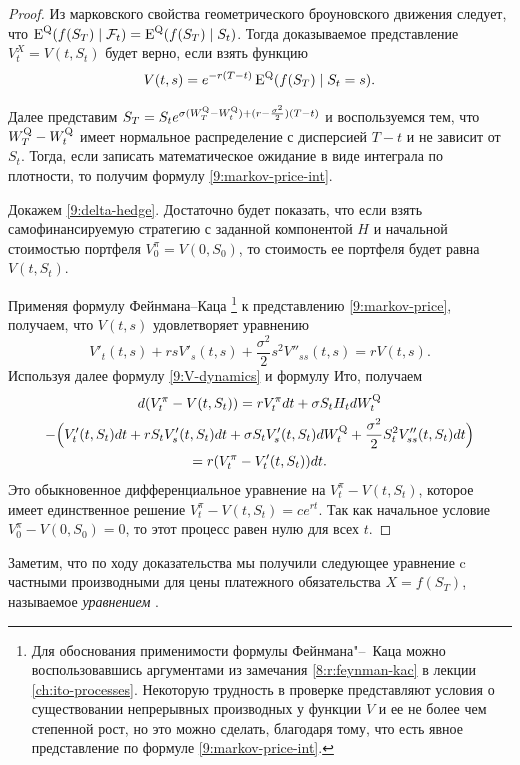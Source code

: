 \begin{proof}
Из марковского свойства геометрического броуновского движения следует, что $\operatorname{E}^{\mathrm{Q}}(f(S_T) \mid \mathcal{F}_t) = \operatorname{E}^{\mathrm{Q}}(f(S_T) \mid S_t)$.
Тогда доказываемое представление $V_t^X=V(t,S_t)$ будет верно, если взять функцию
\begin{equation}
\label{9:markov-price}
V(t,s) = e^{-r(T-t)} \operatorname{E}^{\mathrm{Q}}(f(S_T) \mid S_t = s).
\end{equation}

Далее представим $S_T = S_t e^{\sigma (W_T^{\mathrm{Q}} - W_t^{\mathrm{Q}}) + (r-\frac{\sigma^2}{2})(T-t)}$ и воспользуемся тем, что $W_T^{\mathrm{Q}} - W_t^{\mathrm{Q}}$ имеет нормальное распределение с дисперсией $T-t$ и не зависит от $S_t$. Тогда, если записать математическое ожидание в виде интеграла по плотности, то получим формулу \eqref{9:markov-price-int}. 

Докажем \eqref{9:delta-hedge}. Достаточно будет показать, что если взять самофинансируемую стратегию с заданной компонентой $H$ и начальной стоимостью портфеля $V_0^\pi = V(0,S_0)$, то стоимость ее портфеля будет равна $V(t,S_t)$.

Применяя формулу Фейнмана--Каца%
\footnote{Для обоснования применимости формулы Фейнмана"--~Каца можно воспользовавшись аргументами из замечания \ref{8:r:feynman-kac} в лекции \ref{ch:ito-processes}.
Некоторую трудность в проверке представляют условия о существовании непрерывных производных у функции $V$ и ее не более чем степенной рост, но это можно сделать, благодаря тому, что есть явное представление по формуле \eqref{9:markov-price-int}.} к представлению \eqref{9:markov-price}, получаем, что $V(t,s)$ удовлетворяет уравнению
\[
V'_t(t,s) + rsV'_s(t,s) + \frac{\sigma^2}{2} s^2 V''_{ss}(t,s) = rV(t,s).
\]
Используя далее формулу \eqref{9:V-dynamics} и формулу Ито, получаем
\begin{multline*}
d (V_t^\pi - V(t,S_t)) = rV_t^\pi dt + \sigma S_t  H_t  d W_t^{\mathrm{Q}} \\- \Bigl(V'_t(t,S_t)dt + r S_tV'_s(t,S_t) dt + \sigma  S_tV'_s(t,S_t) dW_t^{\mathrm{Q}} + \frac{\sigma^2}2  S_t^2V''_{ss}(t,S_t) dt \Bigr)\\
 = r(V_t^\pi  - V'_t(t,S_t)) dt.
\end{multline*}
Это обыкновенное дифференциальное уравнение на $V_t^\pi - V(t,S_t)$, которое имеет единственное решение $V_t^\pi - V(t,S_t) = ce^{rt}$.
Так как начальное условие $V_0^\pi - V(0,S_0) = 0$, то этот процесс равен нулю для всех $t$.
\end{proof}

Заметим, что по ходу доказательства мы получили следующее уравнение c частными производными для цены платежного обязательства $X = f(S_T)$, называемое \emph{уравнением \bs}.

